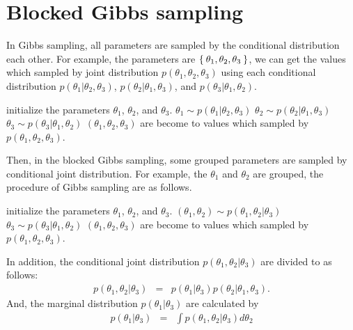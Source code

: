 \documentclass[a4paper]{article}
\begin{document}
\section{Blocked Gibbs sampling}
In Gibbs sampling, all parameters are sampled by the conditional distribution each other.
For example, the parameters are $\Set{\theta_1, \theta_2, \theta_3}$, we can get the values which sampled by joint distribution $p(\theta_1, \theta_2, \theta_3)$ using each conditional distribution $p(\theta_1 | \theta_2, \theta_3)$, $p(\theta_2 | \theta_1, \theta_3)$, and $p(\theta_3 | \theta_1, \theta_2)$.
\begin{algorithmic}[1]
	\STATE initialize the parameters $\theta_1$, $\theta_2$, and $\theta_3$.
		\STATE $\theta_1 \sim p(\theta_1 | \theta_2, \theta_3)$
		\STATE $\theta_2 \sim p(\theta_2 | \theta_1, \theta_3)$
		\STATE $\theta_ 3\sim p(\theta_3 | \theta_1, \theta_2)$
	\ENDWHILE
	\STATE $(\theta_1, \theta_2, \theta_3)$ are become to values which sampled by $p(\theta_1, \theta_2, \theta_3)$.
\end{algorithmic}
Then, in the blocked Gibbs sampling, some grouped parameters are sampled by conditional joint distribution.
For example, the $\theta_1$ and $\theta_2$ are grouped, the procedure of Gibbs sampling are as follows.
\begin{algorithmic}[1]
	\STATE initialize the parameters $\theta_1$, $\theta_2$, and $\theta_3$.
		\STATE $(\theta_1, \theta_2) \sim p(\theta_1, \theta_2 | \theta_3)$
		\STATE $\theta_ 3\sim p(\theta_3 | \theta_1, \theta_2)$
	\ENDWHILE
	\STATE $(\theta_1, \theta_2, \theta_3)$ are become to values which sampled by $p(\theta_1, \theta_2, \theta_3)$.
\end{algorithmic}
In addition, the conditional joint distribution $p(\theta_1, \theta_2 | \theta_3)$ are divided to as follows:
\begin{eqnarray}
p(\theta_1, \theta_2 | \theta_3) &=& p(\theta_1 | \theta_3) p(\theta_2 | \theta_1, \theta_3).
\end{eqnarray}
And, the marginal distribution $p(\theta_1 | \theta_3)$ are calculated by
\begin{eqnarray}
p(\theta_1 | \theta_3) &=& \int{p(\theta_1 , \theta_2 | \theta_3) d\theta_2}
\end{eqnarray}
\end{document}
